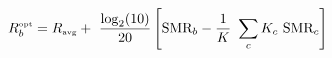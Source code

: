 \documentclass{article}
\begin{document}
 
\[
R_b^{\mbox{\tiny opt}} = R_{\mbox{\tiny avg}} + \
   \frac{\log_2(10)}{20} \left[ \mbox{SMR}_b - \frac{1}{K}  \
   \sum_{c}  K_c \  \mbox{SMR}_c \right]
\]
 \newpage 
\end{document}
